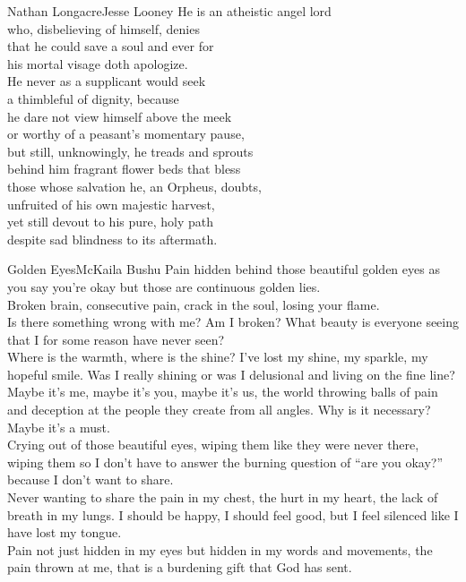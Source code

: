 
\begin{poetry}{Nathan Longacre}{Jesse Looney}
He is an atheistic angel lord\\
who, disbelieving of himself, denies\\
that he could save a soul and ever for\\
his mortal visage doth apologize.\\
He never as a supplicant would seek\\
a thimbleful of dignity, because\\
he dare not view himself above the meek\\
or worthy of a peasant's momentary pause,\\
but still, unknowingly, he treads and sprouts\\
behind him fragrant flower beds that bless\\
those whose salvation he, an Orpheus, doubts,\\
unfruited of his own majestic harvest,\\
yet still devout to his pure, holy path\\
despite sad blindness to its aftermath.
\end{poetry}

\begin{poetry}{Golden Eyes}{McKaila Bushu}
Pain hidden behind those beautiful golden eyes as you say you're okay but those are continuous golden lies.\\
Broken brain, consecutive pain, crack in the soul, losing your flame.\\
Is there something wrong with me? Am I broken? What beauty is everyone seeing that I for some reason have never seen?\\
Where is the warmth, where is the shine? I've lost my shine, my sparkle, my hopeful smile. Was I really shining or was I delusional and living on the fine line?\\
Maybe it's me, maybe it's you, maybe it's us, the world throwing balls of pain and deception at the people they create from all angles. Why is it necessary?\\
\tab{}\tab{}Maybe it's a must.\\
Crying out of those beautiful eyes, wiping them like they were never there, wiping them so I don't have to answer the burning question of “are you okay?” because I don't want to share.\\
Never wanting to share the pain in my chest, the hurt in my heart, the lack of breath in my lungs. I should be happy, I should feel good, but I feel silenced like I have lost my tongue.\\
Pain not just hidden in my eyes but hidden in my words and movements, the pain thrown at me, that is a burdening gift that God has sent.
\end{poetry}

